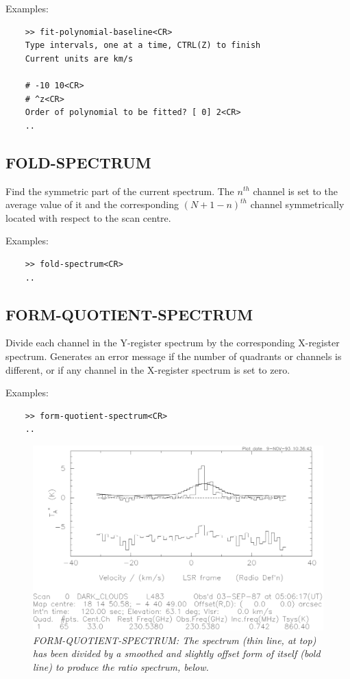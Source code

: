 \documentclass[11pt,twoside]{report}
\begin{document}
Examples:
\begin{verbatim}
    >> fit-polynomial-baseline<CR>
    Type intervals, one at a time, CTRL(Z) to finish
    Current units are km/s

    # -10 10<CR>
    # ^z<CR>
    Order of polynomial to be fitted? [ 0] 2<CR>
    ..
\end{verbatim}

\subsection{FOLD-SPECTRUM} 

Find the symmetric part of the current spectrum. The $n^{th}$ channel is set to
the average value of it and the corresponding $(N+1-n)^{th}$ channel
symmetrically located with respect to the scan centre.

Examples:
\begin{verbatim}
    >> fold-spectrum<CR>
    ..
\end{verbatim}

\subsection{FORM-QUOTIENT-SPECTRUM} 

Divide each channel in the Y-register spectrum by the corresponding X-register
spectrum. Generates an error message if the number of quadrants or channels
is different, or if any channel in the X-register spectrum is set to zero.

Examples:
\begin{verbatim}
    >> form-quotient-spectrum<CR>
    ..
\end{verbatim}

\begin{figure}[htbp]
\begin{center}
\includegraphics[scale=0.65]{quotient.ps}
\protect\parbox{5.5in}
{\caption[QUOTIENT]
{\sl
FORM-QUOTIENT-SPECTRUM: The spectrum (thin line, at top) has been divided by
a smoothed and slightly offset form of itself (bold line) to produce the
ratio spectrum, below.
\label{QUOTIENT}
}
}
\end{center}
\end{figure}
\end{document}
